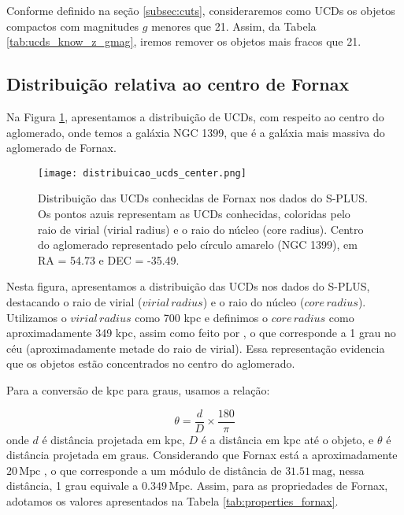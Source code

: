 Conforme definido na seção \ref{subsec:cuts}, consideraremos como UCDs os objetos compactos com magnitudes $g$ menores que 21. Assim, da Tabela \ref{tab:ucds_know_z_gmag}, iremos remover os objetos mais fracos que 21.

\subsection{Distribuição relativa ao centro de Fornax}
Na Figura \ref{distribuicao_ucds_center}, apresentamos a distribuição de UCDs, com respeito ao centro do aglomerado, onde temos a galáxia NGC 1399, que é a galáxia mais massiva do aglomerado de Fornax.

\begin{figure}[!ht]
    \begin{center}
    \texttt{[image: distribuicao\_ucds\_center.png]}
    \caption[]{Distribuição das UCDs conhecidas de Fornax nos dados do S-PLUS. Os pontos azuis representam as UCDs conhecidas, coloridas pelo raio de virial (virial radius) e o raio do núcleo (core radius). Centro do aglomerado representado pelo círculo amarelo (NGC 1399), em \ac{RA} = 54.73 e \ac{DEC} = -35.49.}
    \label{distribuicao_ucds_center}
    \end{center}
\end{figure}

Nesta figura, apresentamos a distribuição das UCDs nos dados do S-PLUS, destacando o raio de virial ($virial \, radius$) e o raio do núcleo ($core \, radius$). Utilizamos o $virial \, radius$ como 700 kpc \citep{Drinkwater_2001} e definimos o $core \, radius$ como aproximadamente 349 kpc, assim como feito por \cite{Saifollahi_2021}, o que corresponde a 1 grau no céu (aproximadamente metade do raio de virial). Essa representação evidencia que os objetos estão concentrados no centro do aglomerado.

Para a conversão de kpc para graus, usamos a relação:

\begin{equation}
    \theta = \frac{d}{D} \times \frac{180}{\pi}
\end{equation}
onde $d$ é distância projetada em kpc, $D$ é a distância em kpc até o objeto, e $\theta$ é distância projetada em graus. Considerando que Fornax está a aproximadamente $20 \, \text{Mpc}$ \citep{Blakeslee_2009}, o que corresponde a um módulo de distância de $31.51 \, \text{mag}$, nessa distância, 1 grau equivale a $0.349 \, \text{Mpc}$. Assim, para as propriedades de Fornax, adotamos os valores apresentados na Tabela \ref{tab:properties_fornax}.

